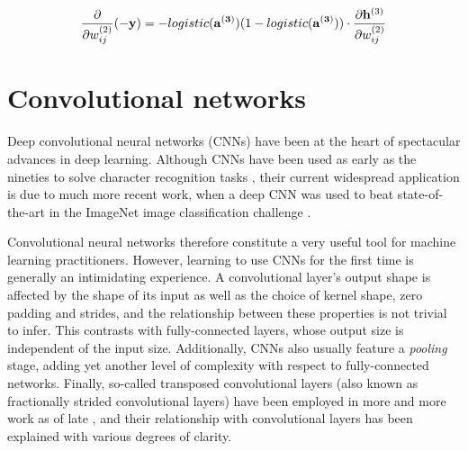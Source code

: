 \begin{equation}\label{eq:backprop_step2}
    \frac{\partial }{\partial w_{ij}^{(2)}}(-\mathbf{y}) =
        -logistic(\mathbf{a^{(3)}})(1-logistic(\mathbf{a^{(3)}})) \cdot
        \frac{\partial \mathbf{h}^{(3)}}{\partial w_{ij}^{(2)}} \\
\end{equation}



\section{Convolutional networks}\label{sec:cnn}

Deep convolutional neural networks (CNNs) have been at the heart of spectacular
advances in deep learning. Although CNNs have been used as early as the nineties
to solve character recognition tasks \citep{le1997reading}, their current
widespread application is due to much more recent work, when a deep CNN was used
to beat state-of-the-art in the ImageNet image classification challenge
\citep{krizhevsky2012imagenet}.

Convolutional neural networks therefore constitute a very useful tool for
machine learning practitioners.
However, learning to use CNNs for the first time
is generally an intimidating experience. A convolutional layer's output shape is
affected by the shape of its input as well as the choice of kernel shape, zero
padding and strides, and the relationship between these properties is not
trivial to infer. This contrasts with fully-connected layers, whose output size
is independent of the input size. Additionally, CNNs also usually feature a {\em
pooling\/} stage, adding yet another level of complexity with respect to
fully-connected networks.  Finally, so-called transposed convolutional layers
(also known as fractionally strided convolutional layers) have been employed in
more and more work as of late \citep{zeiler2011adaptive,zeiler2014visualizing,
long2015fully,radford2015unsupervised,visin15,im2016generating}, and their
relationship with convolutional layers has been explained with various degrees
of clarity.

